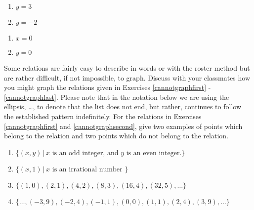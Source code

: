 \begin{multicols}{2}
\begin{enumerate}
\setcounter{enumi}{\value{HW}}

\item $y = 3$
\item $y = -2$

\setcounter{HW}{\value{enumi}}
\end{enumerate}
\end{multicols}



\begin{multicols}{2}
\begin{enumerate}
\setcounter{enumi}{\value{HW}}

\item  $x=0$
\item $y=0$ \label{graphlinelast}

\setcounter{HW}{\value{enumi}}
\end{enumerate}
\end{multicols}


Some relations are fairly easy to describe in words or with the roster method but are rather difficult, if not impossible, to graph. Discuss with your classmates how you might graph the relations given in Exercises \ref{cannotgraphfirst} - \ref{cannotgraphlast}.  Please note that in the notation below we are using the  ellipsis, \ldots, to denote that the list does not end, but rather, continues to follow the established pattern indefinitely.  For the relations in Exercises \ref{cannotgraphfirst} and \ref{cannotgraphsecond}, give two examples of points which belong to the relation and two points which do not belong to the relation.


\begin{enumerate}
\setcounter{enumi}{\value{HW}}


\item $\{(x, y) \, | \, x \mbox{ is an odd integer, and } y \mbox{ is an even integer.}\}$ \label{cannotgraphfirst}
\item $\{(x, 1) \, | \, x \mbox{ is an irrational number }\}$ \label{cannotgraphsecond}
\item $\{(1, 0), (2, 1), (4, 2), (8, 3), (16, 4), (32, 5), \ldots \}$
\item $\{\ldots, (-3, 9), (-2, 4), (-1, 1), (0, 0), (1, 1), (2, 4), (3, 9), \ldots \}$ \label{cannotgraphlast}

\setcounter{HW}{\value{enumi}}
\end{enumerate}


